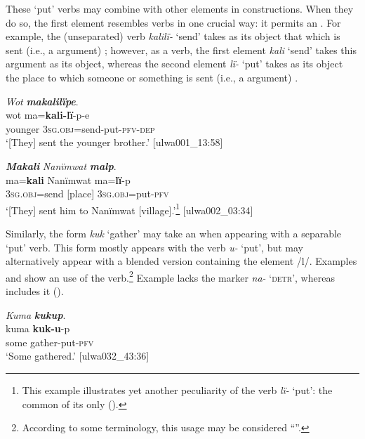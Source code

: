 These ‘put’ verbs may combine with other elements in  constructions. When they do so, the first element resembles verbs in one crucial way: it permits an . For example, the (unseparated) verb \textit{kalilï-} ‘send’ takes as its object that which is sent (i.e., a  argument) ; however, as a  verb, the first element \textit{kali} ‘send’ takes this  argument as its object, whereas the second element \textit{lï-} ‘put’ takes as its object the place to which someone or something is sent (i.e., a  argument) .

\ea%
    \label{ex:phrase:77}
          \textit{Wot} \textbf{\textit{makalilïpe}}.\\
\gll wot    ma=\textbf{kali-lï}{}-p-e\\
    younger  3\textsc{sg.obj}=send-put-\textsc{pfv-dep}\\
\glt `[They] sent the younger brother.’ [ulwa001\_13:58]
\z

\ea%
    \label{ex:phrase:78}
          \textbf{\textit{Makali}} \textit{Nanïmwat} \textbf{\textit{malp}}.\\
\gll ma=\textbf{kali}    Nanïmwat  ma=\textbf{lï}{}-p\\
    \textsc{3sg.obj}=send  [place]    3\textsc{sg.obj}=put-\textsc{pfv}\\
\glt `[They] sent him to Nanïmwat [village].’\footnote{This example illustrates yet another peculiarity of the verb \textit{lï-} ‘put’: the common  of its only  ().} [ulwa002\_03:34]
\z

  Similarly, the form \textit{kuk} ‘gather’ may take an  when appearing with a separable ‘put’ verb. This form mostly appears with the verb \textit{u-} ‘put’, but may alternatively appear with a blended version containing the element /l/. Examples  and  show an  use of the verb.\footnote{According to some terminology, this usage may be considered “”.} Example  lacks the  marker \textit{na-} ‘\textsc{detr}’, whereas  includes it ().

\ea%
    \label{ex:phrase:79}
          \textit{Kuma} \textbf{\textit{kukup}}.\\
\gll kuma  \textbf{kuk-u}-p\\
    some  gather-put-\textsc{pfv}\\
\glt `Some gathered.’ [ulwa032\_43:36]
\z

